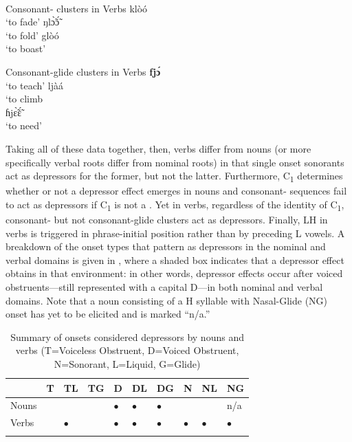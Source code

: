 \documentclass[output=paper
,newtxmath
,modfonts
,nonflat]{langsci/langscibook}
\begin{document}
\pagebreak

\\
\ea\label{ex:lotven:9}Consonant- clusters in  Verbs
\ea\label{ex:lotven:9a}
    klòó\\
    \glt ‘to fade’
\ex\label{ex:lotven:9b}
	ŋlɔ̃̀ɔ̃́\\
    \glt ‘to fold’
\ex\label{ex:lotven:9c}
	glòó\\
    \glt ‘to boast’
\z
\z

\ea\label{ex:lotven:10}Consonant-glide clusters in  Verbs
\ea\label{ex:lotven:10a}
    \textbf{fjɔ́}\\
    \glt ‘to teach’
\ex\label{ex:lotven:10b}
	ljàá\\
    \glt ‘to climb\\
\ex\label{ex:lotven:10c}
	ɦjɛ̃̀ɛ̃́\\
    \glt ‘to need’
\z
\z
        

Taking all of these data together, then, verbs differ from nouns (or more specifically verbal roots differ from nominal roots) in that single onset sonorants act as depressors for the former, but not the latter. Furthermore, C\textsubscript{1} determines whether or not a depressor effect emerges in nouns and consonant- sequences fail to act as depressors if C\textsubscript{1} is not a . Yet in verbs, regardless of the identity of C\textsubscript{1}, consonant- but not consonant-glide clusters act as depressors. Finally, LH  in verbs is triggered in phrase-initial position rather than by preceding L  vowels. A breakdown of the onset types that pattern as depressors in the nominal and verbal domains is given in 
, where a shaded box indicates that a depressor effect obtains in that environment: in other words, depressor effects occur after voiced obstruents—still represented with a capital D—in both nominal and verbal domains. Note that a noun consisting of a H  syllable with Nasal-Glide (NG) onset has yet to be elicited and is marked “n/a.”

\begin{table}
\begin{tabularx}{\textwidth}{Xlllllllll}
\lsptoprule
& {T} & {TL} & {TG} & {D} & {DL} & {DG} & {N} & {NL} & {NG}\\
\midrule
Nouns &  &  &  & $\bullet$ & $\bullet$ & $\bullet$ &  &  & n/a\\
Verbs &  & $\bullet$ &  & $\bullet$ & $\bullet$ & $\bullet$ & $\bullet$ & $\bullet$ & $\bullet$ \\
\lspbottomrule
\end{tabularx}
\caption{Summary of onsets considered depressors by nouns and verbs (T=Voiceless Obstruent, D=Voiced Obstruent, N=Sonorant, L=Liquid, G=Glide)}
\label{fig:lotven:6}
\end{table}
\end{document}
